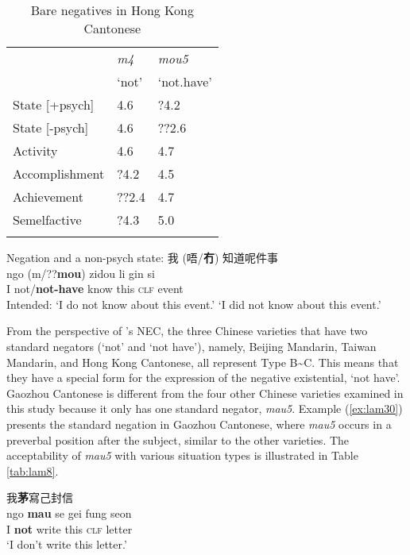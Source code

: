 \documentclass[output=paper]{langscibook}
\begin{document}
\begin{table}
  \begin{tabularx}{\textwidth}{L{2.8cm}XX}
    \lsptoprule
    & \textit{m4} & \textit{mou5}\\
    & `not' & `not.have'\\
     \midrule
State [+psych] &  4.6 & ?4.2\\
State [-psych] &  4.6 & ??2.6\\
Activity &  4.6 &  4.7\\
Accomplishment & ?4.2 &  4.5\\
Achievement & ??2.4 &  4.7\\
Semelfactive & ?4.3 &  5.0\\
\lspbottomrule
\end{tabularx}
  \caption{Bare negatives in Hong Kong Cantonese}
  \label{tab:lam7}
\end{table}

\ea Negation and a non-psych state: 我 (唔/\textbf{冇}) 知道呢件事 \label{ex:lam29}\\
	\gll ngo (m/??\textbf{mou}) zidou li	gin	si\\
	I not/\textbf{not-have} know this \textsc{clf} event\\
	\glt Intended: `I do not know about this event.' `I did not know about this event.'
\z

From the perspective of \citeauthor{Croft1991}'s NEC, the three Chinese varieties that have two standard negators (`not' and `not have'), namely, Beijing Mandarin, Taiwan Mandarin, and Hong Kong Cantonese, all represent Type B\sim C. This means that they have a special form for the expression of the negative existential, `not have'. Gaozhou Cantonese is different from the four other Chinese varieties examined in this study because it only has one standard negator, \textit{mau5}. Example (\ref{ex:lam30}) presents the standard negation in Gaozhou Cantonese, where \textit{mau5} occurs in a preverbal position after the subject, similar to the other varieties. The acceptability of \textit{mau5} with various situation types is illustrated in Table \ref{tab:lam8}. 

\ea 我\textbf{茅}寫己封信 \label{ex:lam30}\\
	\gll ngo \textbf{mau} se gei fung seon\\
	I \textbf{not} write this \textsc{clf} letter\\
	\glt `I don't write this letter.'
\z
\end{document}
